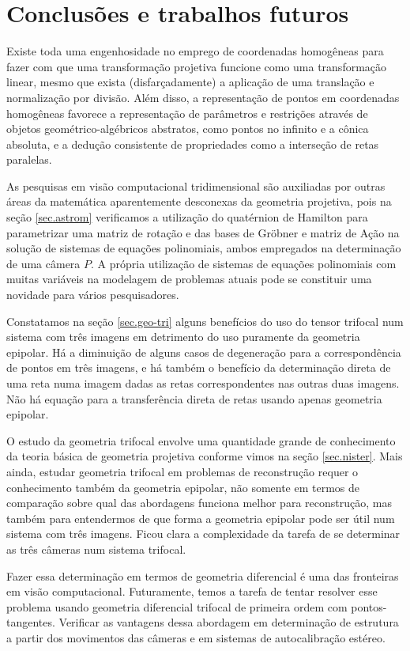\newpage
\section{Conclusões e trabalhos futuros}

Existe toda uma engenhosidade no emprego de coordenadas homogêneas para fazer com que uma transformação projetiva funcione como uma transformação linear, mesmo que exista (disfarçadamente) a aplicação de uma translação e normalização por divisão. Além disso, a representação de pontos em coordenadas homogêneas favorece a representação de parâmetros e restrições através de objetos geométrico-algébricos abstratos, como pontos no infinito e a cônica absoluta, e a dedução consistente de propriedades como a interseção de retas paralelas.

As pesquisas em visão computacional tridimensional são auxiliadas por outras áreas da matemática aparentemente desconexas da geometria projetiva, pois na seção \ref{sec.astrom} verificamos a utilização do quatérnion de Hamilton para parametrizar uma matriz de rotação e das bases de Gr\"obner e matriz de Ação na solução de sistemas de equações polinomiais, ambos empregados na determinação de uma câmera $P$. A própria utilização de sistemas de equações polinomiais com muitas variáveis na modelagem de problemas atuais pode se constituir uma novidade para vários pesquisadores.

Constatamos na seção \ref{sec.geo-tri} alguns benefícios do uso do tensor trifocal num sistema com três imagens em detrimento do uso puramente da geometria epipolar. Há a diminuição de alguns casos de degeneração para a correspondência de pontos em três imagens, e há também o benefício da determinação direta de uma reta numa imagem dadas as retas correspondentes nas outras duas imagens. Não há equação para a transferência direta de retas usando apenas geometria epipolar.

O estudo da geometria trifocal envolve uma quantidade grande de conhecimento da teoria básica de geometria projetiva conforme vimos na seção \ref{sec.nister}. Mais ainda, estudar geometria trifocal em problemas de reconstrução requer o conhecimento também da geometria epipolar, não somente em termos de comparação sobre qual das abordagens funciona melhor para reconstrução, mas também para entendermos de que forma a geometria epipolar pode ser útil num sistema com três imagens. Ficou clara a complexidade da tarefa de se determinar as três câmeras num sistema trifocal.

Fazer essa determinação em termos de geometria diferencial é uma das fronteiras em visão computacional. Futuramente, temos a tarefa de tentar resolver esse problema usando geometria diferencial trifocal de primeira ordem com pontos-tangentes. Verificar as vantagens dessa abordagem em determinação de estrutura a partir dos movimentos das câmeras e em sistemas de autocalibração estéreo.

